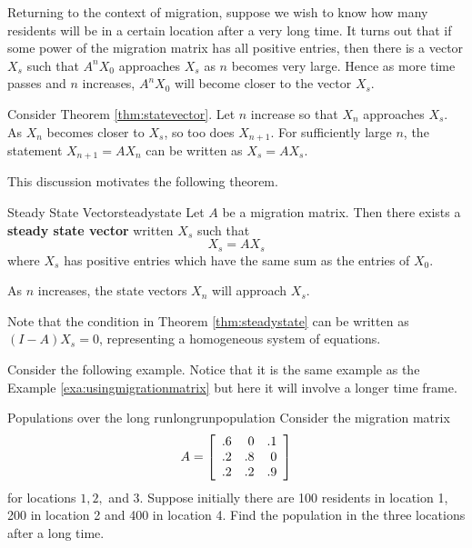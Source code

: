 Returning to the context of migration, suppose we wish to know how many residents will be in a certain location
after a very long time. It turns out that if some power of the
migration matrix has all positive entries, then there is a vector $X_s$ such that $A^{n}X_{0}$ approaches $X_s$ as $n$ becomes very large. Hence as more time passes and $n$ increases, $A^{n}X_{0}$ will become closer to the vector $X_s$. 

Consider Theorem \ref{thm:statevector}. Let $n$ increase so that $X_n$ approaches $X_s$. As $X_n$ becomes closer to $X_s$, so too does $X_{n+1}$. For sufficiently large $n$, the statement $X_{n+1} = AX_n$ can be written as $X_s = AX_s$. 

This discussion motivates the following theorem.

\begin{theorem}{Steady State Vector}{steadystate}
Let $A$ be a migration matrix. Then there exists a \textbf{steady state vector} written $X_s$ such that 
\[
X_s = AX_s
\]
where $X_s$ has positive entries which have the same sum as the entries of $X_0$. 

As $n$ increases, the state vectors $X_n$ will approach $X_s$. 
\end{theorem}

Note that the condition in Theorem \ref{thm:steadystate} can be written as $(I - A)X_s=0$, representing a homogeneous system of equations. 

Consider the following example. Notice that it is the same example as the Example \ref{exa:usingmigrationmatrix} but here it will
involve a longer time frame.

\begin{example}{Populations over the long run}{longrunpopulation}
Consider the migration matrix 
\begin{equation*}
A
=
\left[
\begin{array}{rrr}
.6 & 0 & .1 \\
.2 & .8 & 0 \\
.2 & .2 & .9
\end{array}
\right] 
\end{equation*}
 for locations $1,2,$ and $3.$ Suppose initially there are 100
residents in location 1, 200 in location 2 and 400 in location 4. Find the
population in the three locations after a long time.
\end{example}

